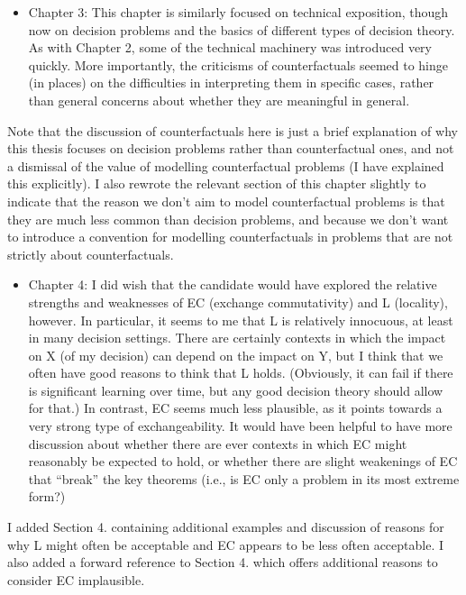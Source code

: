 \documentclass[12pt, a4paper]{article}
\begin{document}
\begin{itemize}
    \item Chapter 3: This chapter is similarly focused on technical exposition, though now on decision problems and the basics of different types of decision theory. As with Chapter 2, some of the technical machinery was introduced very quickly. More importantly, the criticisms of counterfactuals seemed to hinge (in places) on the difficulties in interpreting them in specific cases, rather than general concerns about whether they are meaningful in general.
\end{itemize}

Note that the discussion of counterfactuals here is just a brief explanation of why this thesis focuses on decision problems rather than counterfactual ones, and not a dismissal of the value of modelling counterfactual problems (I have explained this explicitly). I also rewrote the relevant section of this chapter slightly to indicate that the reason we don't aim to model counterfactual problems is that they are much less common than decision problems, and because we don't want to introduce a convention for modelling counterfactuals in problems that are not strictly about counterfactuals.

\begin{itemize}
    \item Chapter 4: I did wish that the candidate would have explored the relative strengths and weaknesses of EC (exchange commutativity) and L (locality), however. In particular, it seems to me that L is relatively innocuous, at least in many decision settings. There are certainly contexts in which the impact on X (of my decision) can depend on the impact on Y, but I think that we often have good reasons to think that L holds. (Obviously, it can fail if there is significant learning over time, but any good decision theory should allow for that.) In contrast, EC seems much less plausible, as it points towards a very strong type of exchangeability. It would have been helpful to have more discussion about whether there are ever contexts in which EC might reasonably be expected to hold, or whether there are slight weakenings of EC that “break” the key theorems (i.e., is EC only a problem in its most extreme form?)
\end{itemize}

I added Section 4. containing additional examples and discussion of reasons for why L might often be acceptable and EC appears to be less often acceptable. I also added a forward reference to Section 4. which offers additional reasons to consider EC implausible.
\end{document}
